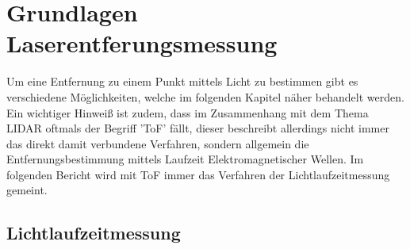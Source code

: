\chapter{Grundlagen Laserentferungsmessung}\label{chap:grund_lidar}
Um eine Entfernung zu einem Punkt mittels Licht zu bestimmen gibt es verschiedene Möglichkeiten, welche im folgenden Kapitel näher behandelt werden. Ein wichtiger Hinweiß ist zudem, dass im Zusammenhang mit dem Thema \ac{LIDAR} oftmals der Begriff '\acf{ToF}' fällt, dieser beschreibt allerdings nicht immer das direkt damit verbundene Verfahren, sondern allgemein die Entfernungsbestimmung mittels Laufzeit Elektromagnetischer Wellen. Im folgenden Bericht wird mit \ac{ToF} immer das Verfahren der Lichtlaufzeitmessung gemeint.  
\section{Lichtlaufzeitmessung}

